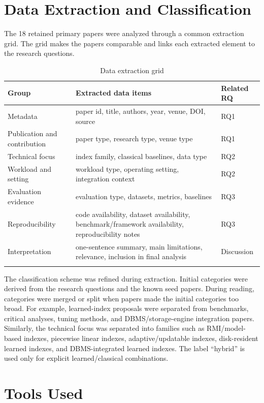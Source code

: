 \documentclass[a4paper, 12pt, twoside]{report}
\begin{document}
\newpage
\section{Data Extraction and Classification}

The 18 retained primary papers were analyzed through a common extraction grid. The grid makes the papers comparable and links each extracted element to the research questions.

\begin{longtable}{|p{3.1cm}|p{7.3cm}|p{2.2cm}|}
\hline
\textbf{Group} & \textbf{Extracted data items} & \textbf{Related RQ} \\
\hline
Metadata & paper id, title, authors, year, venue, DOI, source & RQ1 \\
\hline
Publication and contribution & paper type, research type, venue type & RQ1 \\
\hline
Technical focus & index family, classical baselines, data type & RQ2 \\
\hline
Workload and setting & workload type, operating setting, integration context & RQ2 \\
\hline
Evaluation evidence & evaluation type, datasets, metrics, baselines & RQ3 \\
\hline
Reproducibility & code availability, dataset availability, benchmark/framework availability, reproducibility notes & RQ3 \\
\hline
Interpretation & one-sentence summary, main limitations, relevance, inclusion in final analysis & Discussion \\
\hline
\caption{Data extraction grid}
\label{tab:extraction-grid}
\end{longtable}

The classification scheme was refined during extraction. Initial categories were derived from the research questions and the known seed papers. During reading, categories were merged or split when papers made the initial categories too broad. For example, learned-index proposals were separated from benchmarks, critical analyses, tuning methods, and DBMS/storage-engine integration papers. Similarly, the technical focus was separated into families such as RMI/model-based indexes, piecewise linear indexes, adaptive/updatable indexes, disk-resident learned indexes, and DBMS-integrated learned indexes. The label ``hybrid'' is used only for explicit learned/classical combinations.

\section{Tools Used}
\end{document}
